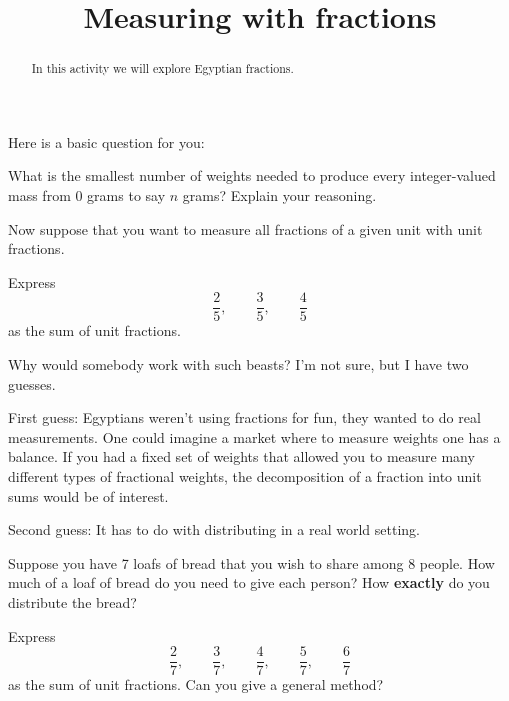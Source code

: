 \documentclass{ximera}
\title{Measuring with fractions}
\begin{document}
\begin{abstract}
In this activity we will explore Egyptian fractions.
\end{abstract}
\maketitle

Here is a basic question for you: 

\begin{question}
What is the smallest number of weights needed to produce every
integer-valued mass from $0$ grams to say $n$ grams? Explain your
reasoning.
\end{question}

Now suppose that you want to measure all fractions of a given unit
with unit fractions. 

\begin{exercise}
Express 
\[
\frac{2}{5}, \qquad \frac{3}{5}, \qquad \frac{4}{5} 
\]
as the sum of unit fractions. 
\end{exercise}

Why would somebody work with such beasts? I'm not sure, but I have two
guesses. 

First guess: Egyptians weren't using fractions for fun, they wanted to do
real measurements. One could imagine a market where to measure weights
one has a balance. If you had a fixed set of weights that allowed you
to measure many different types of fractional weights, the
decomposition of a fraction into unit sums would be of interest.

Second guess: It has to do with distributing in a real world setting.

\begin{question}
Suppose you have 7 loafs of bread that you wish to share among 8
people. How much of a loaf of bread do you need to give each person?
How \textbf{exactly} do you distribute the bread?
\end{question}


\begin{exploration}
Express 
\[
\frac{2}{7}, \qquad \frac{3}{7}, \qquad \frac{4}{7}, \qquad\frac{5}{7}, \qquad\frac{6}{7} 
\]
as the sum of unit fractions. Can you give a general method?
\end{exploration}
\end{document}
